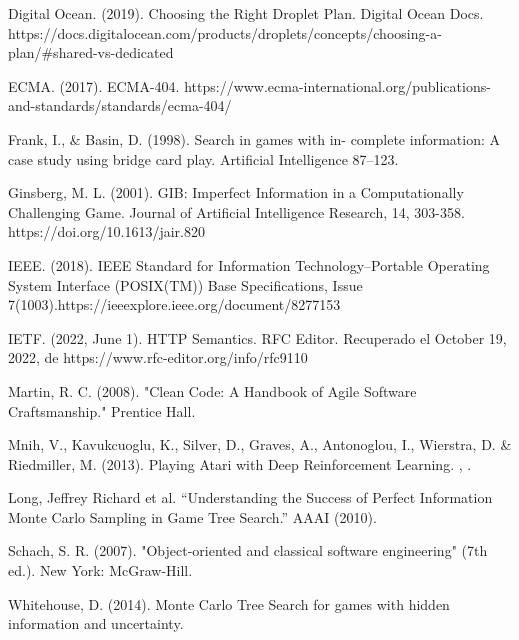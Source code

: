 \documentclass[11pt, oneside]{book}
\begin{document}
\begin{thebibliography}{111}
      \sloppy
       Digital Ocean. (2019). Choosing the Right Droplet Plan.
      Digital Ocean Docs.
      https://docs.digitalocean.com/products/droplets/concepts/choosing-a-plan/\#shared-vs-dedicated
      \fussy %


      ECMA. (2017). ECMA-404.
      https://www.ecma-international.org/publications-and-standards/standards/ecma-404/

      Frank, I., \& Basin, D. (1998). Search in games with in-
      complete information: A case study using bridge card play. Artificial
      Intelligence 87–123.

      Ginsberg, M. L. (2001). GIB: Imperfect Information in
      a Computationally Challenging Game. Journal of Artificial Intelligence
      Research, 14, 303-358. https://doi.org/10.1613/jair.820

      IEEE. (2018). IEEE Standard for Information
      Technology--Portable Operating System Interface (POSIX(TM)) Base
      Specifications, Issue 7(1003).https://ieeexplore.ieee.org/document/8277153

      IETF. (2022, June 1). HTTP Semantics. RFC Editor.
      Recuperado el October 19, 2022, de https://www.rfc-editor.org/info/rfc9110

      Martin, R. C. (2008). "Clean Code: A Handbook of Agile
      Software Craftsmanship." Prentice Hall.

      Mnih, V., Kavukcuoglu, K., Silver, D., Graves, A.,
      Antonoglou, I., Wierstra, D. \& Riedmiller, M. (2013). Playing Atari with
      Deep Reinforcement Learning. , .

      Long, Jeffrey Richard et al. “Understanding the Success
      of Perfect Information Monte Carlo Sampling in Game Tree Search.” AAAI
      (2010).

      Schach, S. R. (2007). "Object-oriented and classical
      software engineering" (7th ed.). New York: McGraw-Hill.


      Whitehouse, D. (2014). Monte Carlo Tree Search for games with
      hidden information and uncertainty.





\end{thebibliography}
\end{document}

